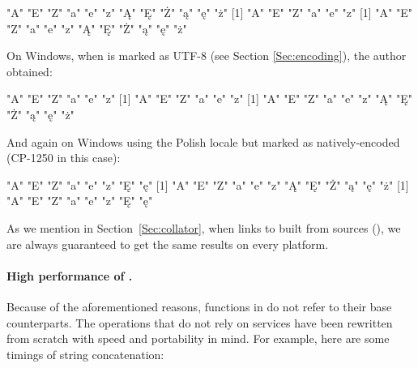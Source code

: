 \documentclass[nojss]{jss}\usepackage[]{graphicx}\usepackage[]{xcolor}
\begin{document}
\begin{Schunk}
\begin{Soutput}
[1] "A" "E" "Z" "a" "e" "z" "Ą" "Ę" "Ż" "ą" "ę" "ż"
[1] "A" "E" "Z" "a" "e" "z"
[1] "A" "E" "Z" "a" "e" "z" "Ą" "Ę" "Ż" "ą" "ę" "ż"
\end{Soutput}
\end{Schunk}

On Windows, when  is marked as UTF-8
(see Section \ref{Sec:encoding}), the author obtained:

\begin{Schunk}
\begin{Soutput}
[1] "A" "E" "Z" "a" "e" "z"
[1] "A" "E" "Z" "a" "e" "z"
[1] "A" "E" "Z" "a" "e" "z" "Ą" "Ę" "Ż" "ą" "ę" "ż"
\end{Soutput}
\end{Schunk}

And again on Windows using the Polish locale
but  marked as natively-encoded (CP-1250 in this case):

\begin{Schunk}
\begin{Soutput}
[1] "A" "E" "Z" "a" "e" "z" "Ę" "ę"
[1] "A" "E" "Z" "a" "e" "z" "Ą" "Ę" "Ż" "ą" "ę" "ż"
[1] "A" "E" "Z" "a" "e" "z" "Ę" "ę"
\end{Soutput}
\end{Schunk}

As we mention in Section~\ref{Sec:collator},
when  links to  built from sources
(),
we are always guaranteed to get the same results on every platform.




\paragraph{High performance of .}
Because of the aforementioned reasons, functions in 
do not refer to their  base  counterparts.
The operations that do not rely on  services
have been rewritten from scratch with speed and portability in mind.
For example, here are some timings of string concatenation:
\end{document}
